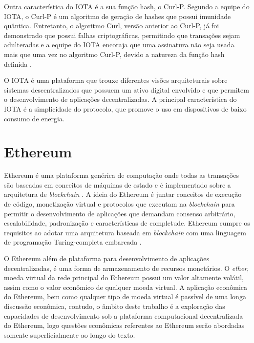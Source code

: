 \documentclass[tcc,capa]{texufpel}
\begin{document}
    Outra característica do IOTA é a sua função hash, o Curl-P. Segundo a equipe do IOTA, o Curl-P é um algoritmo de geração de hashes que possui imunidade quântica. Entretanto, o algoritmo Curl, versão anterior ao Curl-P, já foi demonstrado que possui falhas criptográficas, permitindo que transações sejam adulteradas \cite{heilman} e a equipe do IOTA encoraja que uma assinatura não seja usada mais que uma vez no algoritmo Curl-P, devido a natureza da função hash definida \cite{teamiota}.
    
    O IOTA é uma plataforma que trouxe diferentes visões arquiteturais sobre sistemas descentralizados que possuem um ativo digital envolvido e que permitem o desenvolvimento de aplicações decentralizadas. A principal característica do IOTA é a simplicidade do protocolo, que promove o uso em dispositivos de baixo consumo de energia.



\chapter{Ethereum}\label{chap:ethereum}

    Ethereum é uma plataforma genérica de computação onde todas as transações são baseadas em conceitos de máquinas de estado e é implementado sobre a arquitetura de \textit{blockchain} \cite{wood2014ethereum}. A ideia do Ethereum é juntar conceitos de execução de código, monetização virtual e protocolos que executam na \textit{blockchain} para permitir o desenvolvimento de aplicações que demandam consenso arbitrário, escalabilidade, padronização e características de completude. Ethereum cumpre os requisitos ao adotar uma arquitetura baseada em \textit{blockchain} com uma linguagem de programação Turing-completa embarcada \cite{buterin2014next}.
    
    O Ethereum além de plataforma para desenvolvimento de aplicações decentralizadas, é uma forma de armazenamento de recursos monetários. O \textit{ether}, moeda virtual da rede principal do Ethereum possui um valor altamente volátil, assim como o valor econômico de qualquer moeda virtual. A aplicação econômica do Ethereum, bem como qualquer tipo de moeda virtual é passível de uma longa discussão econômica, contudo, o âmbito deste trabalho é a exploração das capacidades de desenvolvimento sob a plataforma computacional decentralizada do Ethereum, logo questões econômicas referentes ao Ethereum serão abordadas somente superficialmente ao longo do texto.
    
\end{document}
